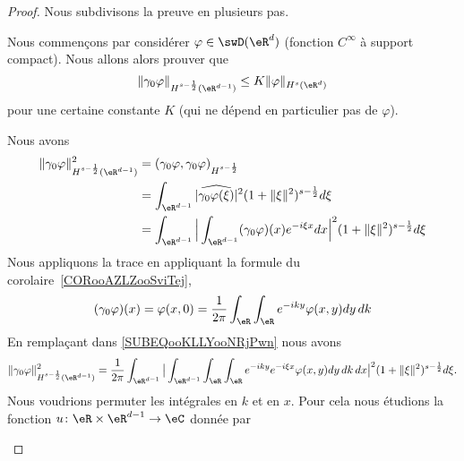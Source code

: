\begin{proof}
	Nous subdivisons la preuve en plusieurs pas.
	\begin{subproof}
		Nous commençons par considérer \( \varphi\in \swD(\eR^d)\) (fonction \(  C^{\infty}\) à support compact). Nous allons alors prouver que
		\begin{equation}
			\| \gamma_0\varphi \|_{H^{s-\frac{ 1 }{2}}(\eR^{d-1})}\leq K\| \varphi \|_{H^s(\eR^d)}
		\end{equation}
		pour une certaine constante \( K\) (qui ne dépend en particulier pas de \( \varphi\)).

		Nous avons
		\begin{subequations}
			\begin{align}
				\| \gamma_0\varphi \|^2_{H^{s-\frac{ 1 }{2}}(\eR^{d-1})} & =(  \gamma_0\varphi,\gamma_0\varphi  )_{H^{s-\frac{ 1 }{2}}}                                                                                       \\
				                                                         & =\int_{\eR^{d-1}}| \widehat{\gamma_0\varphi(\xi)} |^2(1+\| \xi \|^2)^{s-\frac{ 1 }{2}}d\xi                                                         \\
				                                                         & =\int_{\eR^{d-1}}\Big| \int_{\eR^{d-1}}(\gamma_0\varphi)(x) e^{-i\xi x}dx \Big|^2(1+\| \xi \|^2)^{s-\frac{ 1 }{2}}d\xi \label{SUBEQooKLLYooNRjPwn} \\
			\end{align}
		\end{subequations}
		Nous appliquons la trace en appliquant la formule du corolaire~\ref{CORooAZLZooSviTej},
		\begin{equation}
			(\gamma_0\varphi)(x)= \varphi(x,0) =\frac{1}{ 2\pi }\int_{\eR}\int_{\eR} e^{-iky}\varphi(x,y)dy\,dk
		\end{equation}
		En remplaçant dans \eqref{SUBEQooKLLYooNRjPwn} nous avons
		\begin{equation}
			\| \gamma_0\varphi \|^2_{H^{s-\frac{ 1 }{2}}(\eR^{d-1})}=\frac{1}{ 2\pi }\int_{\eR^{d-1}}\big| \int_{\eR^{d-1}}\int_{\eR}\int_{\eR} e^{-iky} e^{-i\xi x}\varphi(x,y)dy\,dk\,dx \big|^2(1+\| \xi \|^2)^{s-\frac{ 1 }{2}}d\xi.
		\end{equation}
		Nous voudrions permuter les intégrales en \( k\) et en \( x\). Pour cela nous étudions la fonction \( u\colon \eR\times \eR^{d-1}\to \eC\) donnée par
		\begin{equation}

\end{equation}
\end{subproof}
\end{proof}
